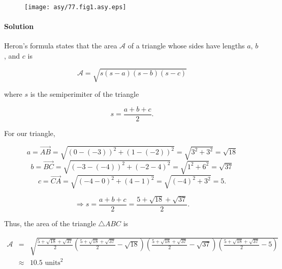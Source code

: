 
\begin{figure}\caption{}\label{77.fig1}\begin{center}\texttt{[image: asy/77.fig1.asy.eps]}\end{center}\end{figure}


\paragraph{Solution} Heron's formula states that the area $\mathcal{A}$ of a triangle whose sides have lengths $a$, $b$, and $c$ is

\[\mathcal{A}=\sqrt{s\left(s-a\right)\left(s-b\right)\left(s-c\right)}\]

where $s$ is the semiperimiter of the triangle

\[s=\frac{a+b+c}{2}.\]

For our triangle,

\[a=\overrightarrow{AB}=\sqrt{\left(0-\left(-3\right)\right)^2+\left(1-\left(-2\right)\right)^2}=\sqrt{3^2+3^2}=\sqrt{18}\]
\[b=\overrightarrow{BC}=\sqrt{\left(-3-\left(-4\right)\right)^2+\left(-2-4\right)^2}=\sqrt{1^2+6^2}=\sqrt{37}\]
\[c=\overrightarrow{CA}=\sqrt{\left(-4-0\right)^2+\left(4-1\right)^2}=\sqrt{\left(-4\right)^2+3^2}=5.\]


\[\Rightarrow s=\frac{a+b+c}{2}=\frac{5+\sqrt{18}+\sqrt{37}}{2}.\]

Thus, the area of the triangle $\triangle ABC$ is

\begin{eqnarray*}
    \mathcal{A}&=&\sqrt{\frac{5+\sqrt{18}+\sqrt{37}}{2}\left(\frac{5+\sqrt{18}+\sqrt{37}}{2}-\sqrt{18}\right)\left(\frac{5+\sqrt{18}+\sqrt{37}}{2}-\sqrt{37}\right)\left(\frac{5+\sqrt{18}+\sqrt{37}}{2}-5\right)}\\
    &\approx&10.5\mbox{ units}^2
\end{eqnarray*}
